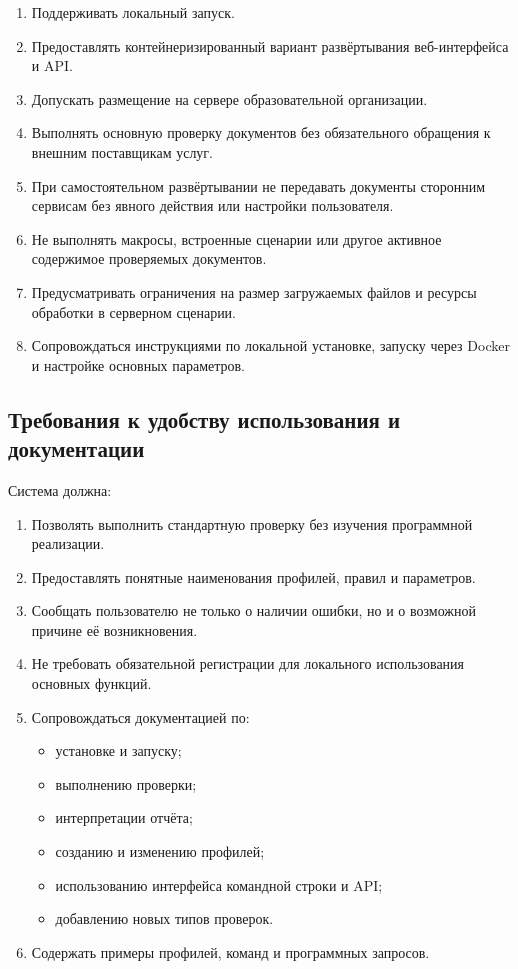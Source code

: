 \documentclass[a4paper,14pt]{extarticle}
\begin{document}
\begin{enumerate}
    \item Поддерживать локальный запуск.
    \item Предоставлять контейнеризированный вариант развёртывания веб-интерфейса и API.
    \item Допускать размещение на сервере образовательной организации.
    \item Выполнять основную проверку документов без обязательного обращения к внешним поставщикам услуг.
    \item При самостоятельном развёртывании не передавать документы сторонним сервисам без явного действия или настройки пользователя.
    \item Не выполнять макросы, встроенные сценарии или другое активное содержимое проверяемых документов.
    \item Предусматривать ограничения на размер загружаемых файлов и ресурсы обработки в серверном сценарии.
    \item Сопровождаться инструкциями по локальной установке, запуску через Docker и настройке основных параметров.
\end{enumerate}

\subsection{Требования к удобству использования и документации}

Система должна:

\begin{enumerate}
    \item Позволять выполнить стандартную проверку без изучения программной реализации.
    \item Предоставлять понятные наименования профилей, правил и параметров.
    \item Сообщать пользователю не только о наличии ошибки, но и о возможной причине её возникновения.
    \item Не требовать обязательной регистрации для локального использования основных функций.
    \item Сопровождаться документацией по:
    \begin{itemize}
        \item установке и запуску;
        \item выполнению проверки;
        \item интерпретации отчёта;
        \item созданию и изменению профилей;
        \item использованию интерфейса командной строки и API;
        \item добавлению новых типов проверок.
    \end{itemize}
    \item Содержать примеры профилей, команд и программных запросов.
\end{enumerate}
\end{document}
